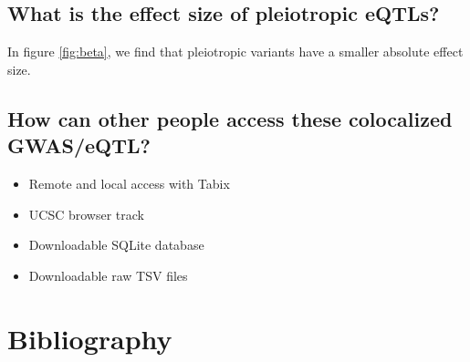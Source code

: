 \subsection*{What is the effect size of pleiotropic eQTLs?}

In figure \ref{fig:beta}, we find that pleiotropic variants have a smaller absolute effect size.

\subsection*{How can other people access these colocalized GWAS/eQTL?}

\begin{itemize}
  \item Remote and local access with Tabix
  \item UCSC browser track
  \item Downloadable SQLite database
  \item Downloadable raw TSV files
\end{itemize}

\section*{Bibliography}


